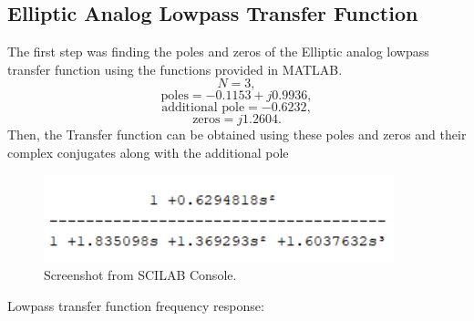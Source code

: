 \documentclass[12pt]{article}
\begin{document}
\subsection{Elliptic Analog Lowpass Transfer Function}
The first step was finding the poles and zeros of the Elliptic analog lowpass transfer function using the functions provided in MATLAB.
\[N = 3,\]
\[\text{poles} = -0.1153 + j0.9936,\]
\[\text{additional pole} = -0.6232,\]
\[\text{zeros} = j1.2604.\]
Then, the Transfer function can be obtained using these poles and zeros and their complex conjugates along with the additional pole

\begin{figure}[h]
    \centering
    \includegraphics{h_lpf_bs.png}
    \caption{Screenshot from SCILAB Console.}
\end{figure}
Lowpass transfer function frequency response:
\end{document}
